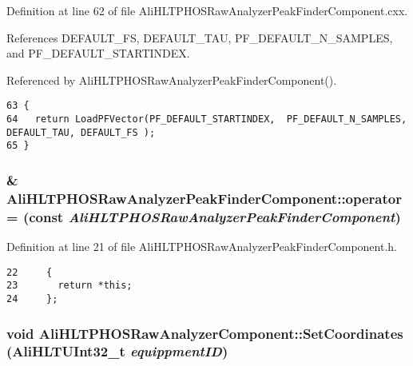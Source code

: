 Definition at line 62 of file Ali\-HLTPHOSRaw\-Analyzer\-Peak\-Finder\-Component.cxx.

References DEFAULT\_\-FS, DEFAULT\_\-TAU, PF\_\-DEFAULT\_\-N\_\-SAMPLES, and PF\_\-DEFAULT\_\-STARTINDEX.

Referenced by Ali\-HLTPHOSRaw\-Analyzer\-Peak\-Finder\-Component().

\footnotesize\begin{verbatim}63 {
64   return LoadPFVector(PF_DEFAULT_STARTINDEX,  PF_DEFAULT_N_SAMPLES, DEFAULT_TAU, DEFAULT_FS );
65 }
\end{verbatim}\normalsize 


\subsubsection{\& Ali\-HLTPHOSRaw\-Analyzer\-Peak\-Finder\-Component::operator= (const  {\em Ali\-HLTPHOSRaw\-Analyzer\-Peak\-Finder\-Component})\hspace{0.3cm}{\tt  [inline, private]}}\label{classAliHLTPHOSRawAnalyzerPeakFinderComponent_AliHLTPHOSRawAnalyzerPeakFinderComponentd3}




Definition at line 21 of file Ali\-HLTPHOSRaw\-Analyzer\-Peak\-Finder\-Component.h.

\footnotesize\begin{verbatim}22     {
23       return *this;
24     };
\end{verbatim}\normalsize 


\subsubsection{\setlength{\rightskip}{0pt plus 5cm}void Ali\-HLTPHOSRaw\-Analyzer\-Component::Set\-Coordinates (Ali\-HLTUInt32\_\-t {\em equippment\-ID})\hspace{0.3cm}{\tt  [inherited]}}\label{classAliHLTPHOSRawAnalyzerComponent_AliHLTPHOSRawAnalyzerPeakFinderComponenta12}




